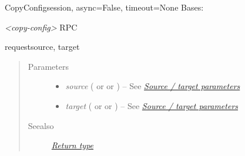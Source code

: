 \documentclass[a4paper,10pt,english]{manual}
\begin{document}
\hypertarget{ncclient.operations.CopyConfig}{}\begin{classdesc}{CopyConfig}{session, async=False, timeout=None}
Bases: \hyperlink{ncclient.operations.rpc.RPC}{}

\emph{\textless{}copy-config\textgreater{}} RPC

\hypertarget{ncclient.operations.CopyConfig.request}{}\begin{methoddesc}{request}{source, target}~\begin{quote}\begin{description}
\item[Parameters]\begin{itemize}
\item {} 
\emph{source} (\href{http://docs.python.org/library/string.html\#string}{} or \href{http://docs.python.org/library/stdtypes.html\#dict}{} or \href{http://docs.python.org/library/xml.etree.elementtree.html\#xml.etree.ElementTree.Element}{}) -- See \hyperlink{source-target}{\emph{Source / target parameters}}

\item {} 
\emph{target} (\href{http://docs.python.org/library/string.html\#string}{} or \href{http://docs.python.org/library/stdtypes.html\#dict}{} or \href{http://docs.python.org/library/xml.etree.elementtree.html\#xml.etree.ElementTree.Element}{}) -- See \hyperlink{source-target}{\emph{Source / target parameters}}

\end{itemize}

\item[Seealso]
\hyperlink{return}{\emph{Return type}}

\end{description}\end{quote}
\end{methoddesc}
\end{classdesc}
\end{document}
